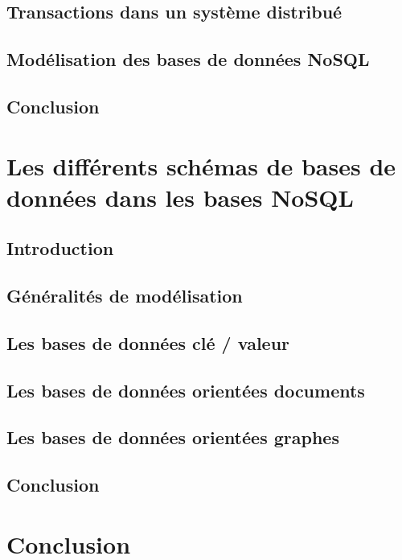 \documentclass[12pt,titlepage,a4paper]{report}
\begin{document}
		\section{Transactions dans un système distribué}
			

		\section{Modélisation des bases de données NoSQL}
			

		\section*{Conclusion}
			

	\chapter{Les différents schémas de bases de données dans les bases NoSQL}
	\minitoc

		\section*{Introduction}
			

		\section{Généralités de modélisation}
			

		\section{Les bases de données clé / valeur}
		\label{sec:BDDClesValeur}
			

		\section{Les bases de données orientées documents}
		\label{sec:BDDDocuments}
      		

		\section{Les bases de données orientées graphes}
		\label{sec:BDDGraphes}
			

		\section*{Conclusion}
			

	\chapter*{Conclusion}
		

	
	
\end{document}
